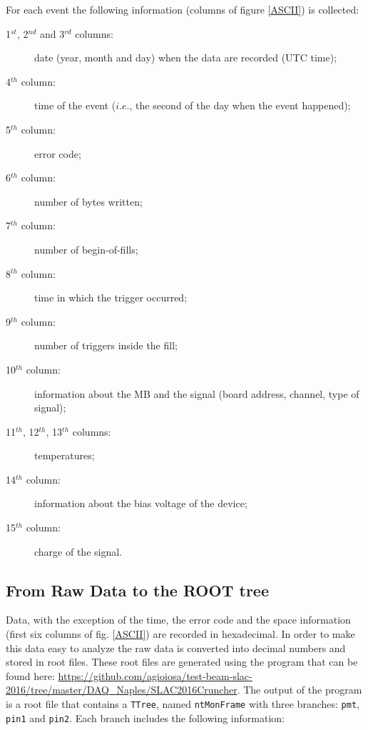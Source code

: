 \noindent For each event the following information (columns of figure \ref{ASCII}) is collected:
\begin{description}
  \item[1$^{st}$, 2$^{nd}$ and 3$^{rd}$ columns:] date (year, month and day) when the data are recorded (UTC time);
  \item[4$^{th}$ column:] time of the event ($i.e.$, the second of the day when the event happened);
 \item[5$^{th}$ column:] error code;
 \item[6$^{th}$ column:] number of bytes written;
 \item[7$^{th}$ column:] number of begin-of-fills;
 \item[8$^{th}$ column:] time in which the trigger occurred;
 \item[9$^{th}$ column:] number of triggers inside the fill;
 \item[10$^{th}$ column:] information about the MB and the signal (board address, channel, type of signal);
 \item[11$^{th}$, 12$^{th}$, 13$^{th}$ columns:] temperatures;
 \item[14$^{th}$ column:] information about the bias voltage of the device;
 \item[15$^{th}$ column:] charge of the signal.
\end{description} 

\subsection{From Raw Data to the ROOT tree}

Data, with the exception of the time, the error code and the space information (first six columns of fig. \ref{ASCII}) are recorded in hexadecimal. In order to make this data easy to analyze the raw data is converted into decimal numbers and stored in root files.
These root files are generated using the program that can be found here: \url{https://github.com/agioiosa/test-beam-slac-2016/tree/master/DAQ_Naples/SLAC2016Cruncher}.
The output of the program is a root file that contains a \verb+TTree+, named \verb+ntMonFrame+ with three branches: \verb+pmt+, \verb+pin1+ and \verb+pin2+. Each branch includes the following information:

